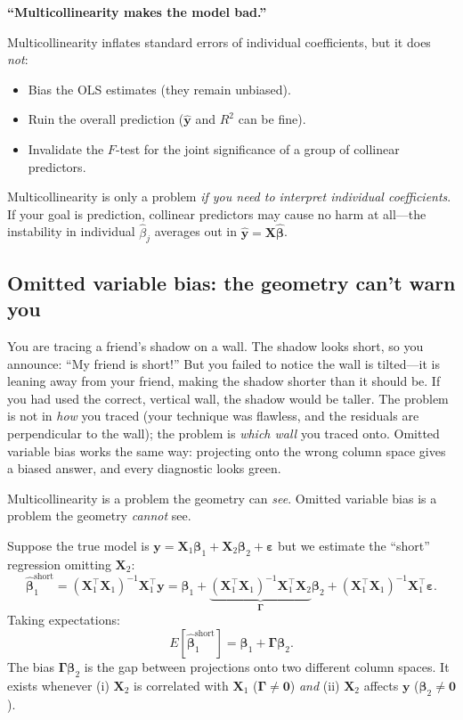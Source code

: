 \documentclass[11pt,a4paper]{article}
\theoremstyle{plain}
\theoremstyle{definition}
\newcommand{\yhat}{\hat{\bm{y}}}
\newcommand{\bhat}{\hat{\bm{\beta}}}
\newcommand{\bX}{\bm{X}}
\newcommand{\by}{\bm{y}}
\begin{document}
\begin{misconception}
\textbf{``Multicollinearity makes the model bad.''}

Multicollinearity inflates standard errors of individual coefficients,
but it does \emph{not}:
\begin{itemize}[nosep]
  \item Bias the OLS estimates (they remain unbiased).
  \item Ruin the overall prediction ($\yhat$ and $R^2$ can be fine).
  \item Invalidate the $F$-test for the joint significance of a group
        of collinear predictors.
\end{itemize}
Multicollinearity is only a problem \emph{if you need to interpret
individual coefficients}.
If your goal is prediction, collinear predictors may cause no harm
at all---the instability in individual $\hat{\beta}_j$ averages out in
$\yhat = \bX\bhat$.
\end{misconception}

\subsection{Omitted variable bias: the geometry can't warn you}

\begin{toystory}
You are tracing a friend's shadow on a wall.  The shadow looks short,
so you announce: ``My friend is short!''  But you failed to notice the
wall is tilted---it is leaning away from your friend, making the shadow
shorter than it should be.  If you had used the correct, vertical wall,
the shadow would be taller.  The problem is not in \emph{how} you
traced (your technique was flawless, and the residuals are perpendicular
to the wall); the problem is \emph{which wall} you traced onto.
Omitted variable bias works the same way: projecting onto the wrong
column space gives a biased answer, and every diagnostic looks green.
\end{toystory}

\begin{warning}
Multicollinearity is a problem the geometry can \emph{see}.
Omitted variable bias is a problem the geometry \emph{cannot} see.
\end{warning}

Suppose the true model is
$\by = \bX_1\bm{\beta}_1 + \bX_2\bm{\beta}_2 + \bm{\varepsilon}$
but we estimate the ``short'' regression omitting $\bX_2$:
\[
  \bhat_1^{\text{short}}
  = (\bX_1^\top\bX_1)^{-1}\bX_1^\top\by
  = \bm{\beta}_1 + \underbrace{(\bX_1^\top\bX_1)^{-1}\bX_1^\top\bX_2}_{\bm{\Gamma}}\bm{\beta}_2
    + (\bX_1^\top\bX_1)^{-1}\bX_1^\top\bm{\varepsilon}.
\]
Taking expectations:
\begin{equation}\label{eq:ovb}
  \boxed{
  E[\bhat_1^{\text{short}}] = \bm{\beta}_1 + \bm{\Gamma}\bm{\beta}_2.
  }
\end{equation}
The bias $\bm{\Gamma}\bm{\beta}_2$ is the gap between projections onto
two different column spaces.
It exists whenever (i) $\bX_2$ is correlated with $\bX_1$
($\bm{\Gamma}\ne\bm{0}$) \emph{and} (ii) $\bX_2$ affects $\by$
($\bm{\beta}_2\ne\bm{0}$).
\end{document}
